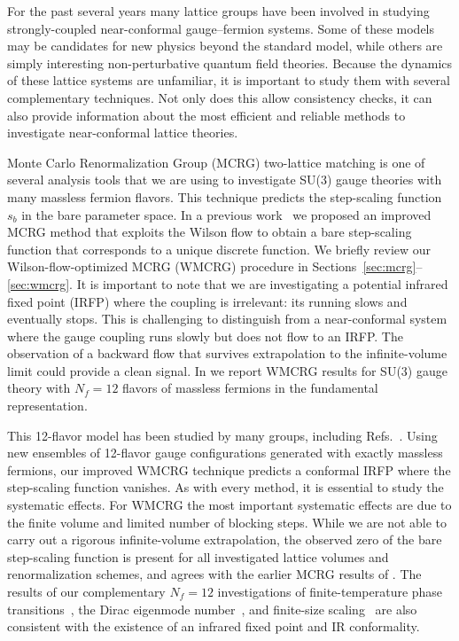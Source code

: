 
For the past several years many lattice groups have been involved in studying strongly-coupled near-conformal gauge--fermion systems.
Some of these models may be candidates for new physics beyond the standard model, while others are simply interesting non-perturbative quantum field theories.
Because the dynamics of these lattice systems are unfamiliar, it is important to study them with several complementary techniques.
Not only does this allow consistency checks, it can also provide information about the most efficient and reliable methods to investigate near-conformal lattice theories.

Monte Carlo Renormalization Group (MCRG) two-lattice matching is one of several analysis tools that we are using to investigate SU(3) gauge theories with many massless fermion flavors.
This technique predicts the step-scaling function $s_b$ in the bare parameter space.
In a previous work~\cite{Petropoulos:2012mg} we proposed an improved MCRG method that exploits the Wilson flow to obtain a bare step-scaling function that corresponds to a unique discrete \be function.
We briefly review our Wilson-flow-optimized MCRG (WMCRG) procedure in Sections~\ref{sec:mcrg}--\ref{sec:wmcrg}.
It is important to note that we are investigating a potential infrared fixed point (IRFP) where the coupling is irrelevant: its running slows and eventually stops.
This is challenging to distinguish from a near-conformal system where the gauge coupling runs slowly but does not flow to an IRFP.
The observation of a backward flow that survives extrapolation to the infinite-volume limit could provide a clean signal.
In  we report WMCRG results for SU(3) gauge theory with $N_f = 12$ flavors of massless fermions in the fundamental representation.

This 12-flavor model has been studied by many groups, including Refs.~\cite{Appelquist:2009ty, Deuzeman:2009mh, Fodor:2011tu, Appelquist:2011dp, Hasenfratz:2011xn, DeGrand:2011cu, Cheng:2011ic, Jin:2012dw, Lin:2012iw, Aoki:2012eq, Fodor:2012uw, Fodor:2012et, Itou:2012qn, Cheng:2013eu, Aoki:2013pca, Hasenfratz:2013uha, Hasenfratz:2013eka, Cheng:2013bca}.
Using new ensembles of 12-flavor gauge configurations generated with exactly massless fermions, our improved WMCRG technique predicts a conformal IRFP where the step-scaling function vanishes.
As with every method, it is essential to study the systematic effects.
For WMCRG the most important systematic effects are due to the finite volume and limited number of blocking steps.
While we are not able to carry out a rigorous infinite-volume extrapolation, the observed zero of the bare step-scaling function is present for all investigated lattice volumes and renormalization schemes, and agrees with the earlier MCRG results of .
The results of our complementary $N_f = 12$ investigations of finite-temperature phase transitions~\cite{Schaich:2012fr, Hasenfratz:2013uha}, the Dirac eigenmode number~\cite{Cheng:2013eu, Cheng:2013bca}, and finite-size scaling~\cite{Hasenfratz:2013eka} are also consistent with the existence of an infrared fixed point and IR conformality.
